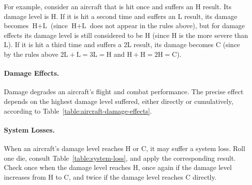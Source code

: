 {

For example, consider an aircraft that is hit once and suffers an H result. Its damage level is H. If it is hit a second time and suffers an L result, its damage becomes $\textrm{H}+\textrm{L}$ (since $\textrm{H}+\textrm{L}$ does not appear in the rules above), but for damage effects its damage level is still considered to be H (since H is the more severe than L). If it is hit a third time and suffers a 2L result, its damage becomes C (since by the rules above $2\textrm{L} + \textrm{L} = 3\textrm{L} = \textrm{H}$ and $\textrm{H} + \textrm{H} = 2\textrm{H} = \textrm{C}$).


\paragraph{Damage Effects.}
Damage degrades an aircraft's flight and combat performance. The precise effect depends on the highest damage level suffered, either directly or cumulatively, according to Table~\ref{table:aircraft-damage-effects}.



\paragraph{System Losses.}
When an aircraft's damage level reaches H or C, it may suffer a system loss. Roll one die, consult Table~\ref{table:system-loss}, and apply the corresponding result. Check once when the damage level reaches H, once again if the damage level increases from H to C, and twice if the damage level reaches C directly.



}


